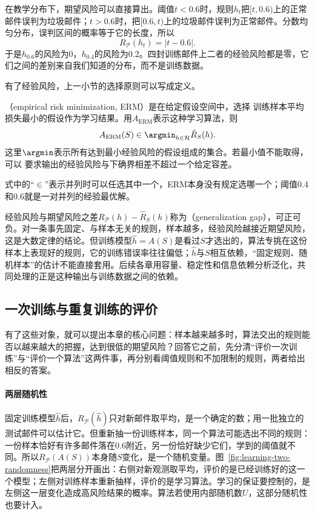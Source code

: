 在教学分布下，期望风险可以直接算出。阈值$t<0.6$时，规则$h_t$把$[t,0.6)$上的正常邮件误判为垃圾邮件；$t>0.6$时，把$[0.6,t)$上的垃圾邮件误判为正常邮件。分数均匀分布，误判区间的概率等于它的长度，所以
\begin{equation}
 R_{\mathcal P}(h_t)=|t-0.6|.
 \label{eq:threshold-teaching-risk}
\end{equation}
于是$h_{0.6}$的风险为0，$h_{0.4}$的风险为0.2。四封训练邮件上二者的经验风险都是零，它们之间的差别来自我们知道的分布，而不是训练数据。

有了经验风险，上一小节的选择原则可以写成定义。

\begin{definition}[经验风险最小化]
\label{def:erm-learning-rule}
（empirical risk minimization, ERM）是在给定假设空间中，选择
训练样本平均损失最小的假设作为学习结果。用$A_{\mathrm{ERM}}$表示这种学习算法，则
\begin{equation}
 A_{\mathrm{ERM}}(S)\in\argmin_{h\in\mathcal H}\hat R_S(h).
 \label{eq:erm-learning-rule}
\end{equation}
这里$\argmin$表示所有达到最小经验风险的假设组成的集合。若最小值不能取得，可以
要求输出的经验风险与下确界相差不超过一个给定容差。
\end{definition}

式中的“$\in$”表示并列时可以任选其中一个，ERM本身没有规定选哪一个；阈值0.4和0.6就是一对并列的经验最优解。

经验风险与期望风险之差$R_{\mathcal P}(h)-\hat R_S(h)$称为（generalization gap），可正可负。对一条事先固定、与样本无关的规则，样本越多，经验风险越接近期望风险，这是大数定律的结论。但训练模型$\hat h=A(S)$是看过$S$才选出的，算法专挑在这份样本上表现好的规则，它的训练错误率往往偏低；$\hat h$与$S$相互依赖，“固定规则、随机样本”的估计不能直接套用。后续各章用容量、稳定性和信息依赖分析泛化，共同处理的正是这种输出与训练数据之间的依赖。

\subsection{一次训练与重复训练的评价}
\label{sec:learning-problem-learnable}

有了这些对象，就可以提出本章的核心问题：样本越来越多时，算法交出的规则能否以越来越大的把握，达到很低的期望风险？回答它之前，先分清“评价一次训练”与“评价一个算法”这两件事，再分别看阈值规则和不加限制的规则，两者给出相反的答案。

\paragraph{两层随机性}
固定训练模型$\hat h$后，$R_{\mathcal P}(\hat h)$只对新邮件取平均，是一个确定的数；用一批独立的测试邮件可以估计它。但重新抽一份训练样本，同一个算法可能选出不同的规则：一份样本恰好有许多邮件落在0.6附近，另一份恰好缺少它们，学到的阈值就不同。所以$R_{\mathcal P}(A(S))$本身随$S$变化，是一个随机变量。图~\ref{fig:learning-two-randomness}把两层分开画出：右侧对新观测取平均，评价的是已经训练好的这一个模型；左侧对训练样本重新抽样，评价的是学习算法。学习的保证要控制的，是左侧这一层变化造成高风险结果的概率。算法若使用内部随机数$U$，这部分随机性也要计入。

